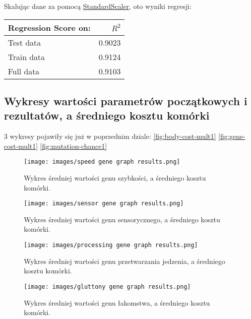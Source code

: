 \documentclass{article}
\begin{document}
Skalując dane za pomocą \href{https://scikit-learn.org/stable/modules/generated/sklearn.preprocessing.StandardScaler.html}{StandardScaler}, oto wyniki regresji:
\begin{table}[H]
    \centering
    \begin{tabular}{lr}
        \toprule
        \textbf{Regression Score on: } & \textbf{\(R^2\)} \\
        \midrule        
        Test data & 0.9023 \\
        Train data & 0.9124 \\
        Full data & 0.9103 \\    
        \bottomrule
    \end{tabular}
\end{table}

\subsection{Wykresy wartości parametrów początkowych i rezultatów, a średniego kosztu komórki}

3 wykresy pojawiły się już w poprzednim dziale:
\ref{fig:body-cost-mult1}
\ref{fig:gene-cost-mult1}
\ref{fig:mutation-chance1}

\begin{figure}[H]
    \centering
    \texttt{[image: images/speed gene graph results.png]}
    \caption{Wykres średniej wartości genu szybkości, a średniego kosztu komórki.}
\end{figure}

\begin{figure}[H]
    \centering
    \texttt{[image: images/sensor gene graph results.png]}
    \caption{Wykres średniej wartości genu sensorycznego, a średniego kosztu komórki.}
\end{figure}

\begin{figure}[H]
    \centering
    \texttt{[image: images/processing gene graph results.png]}
    \caption{Wykres średniej wartości genu przetwarzania jedzenia, a średniego kosztu komórki.}
\end{figure}

\begin{figure}[H]
    \centering
    \texttt{[image: images/gluttony gene graph results.png]}
    \caption{Wykres średniej wartości genu łakomstwa, a średniego kosztu komórki.}
\end{figure}
\end{document}

